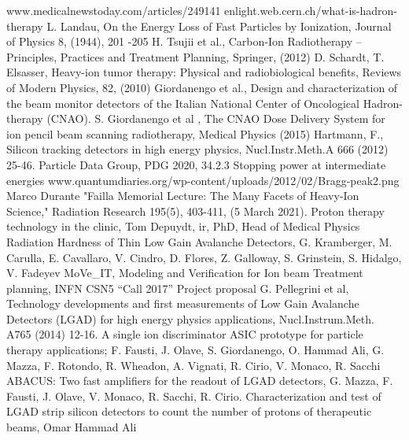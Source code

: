 \pagestyle{plain}
\begin{thebibliography}{00}	
	www.medicalnewstoday.com/articles/249141
	enlight.web.cern.ch/what-is-hadron-therapy
	L. Landau, On the Energy Loss of Fast Particles by Ionization, Journal of Physics 8, (1944), 201 -205
	H. Tsujii et al., Carbon-Ion Radiotherapy – Principles, Practices and Treatment Planning, Springer, (2012)
	D. Schardt, T. Elsasser, Heavy-ion tumor therapy: Physical and radiobiological benefits, Reviews of Modern Physics, 82, (2010)
	Giordanengo et al., Design and characterization of the beam monitor detectors of the Italian National Center of Oncological Hadron-therapy (CNAO).
	S. Giordanengo et al , The CNAO Dose Delivery System for ion pencil beam scanning radiotherapy, Medical Physics (2015)
	Hartmann, F., Silicon tracking detectors in high energy physics, Nucl.Instr.Meth.A 666 (2012) 25-46.
	Particle Data Group, PDG 2020, 34.2.3 Stopping power at intermediate energies
	www.quantumdiaries.org/wp-content/uploads/2012/02/Bragg-peak2.png
	Marco Durante "Failla Memorial Lecture: The Many Facets of Heavy-Ion Science," Radiation Research 195(5), 403-411, (5 March 2021).
	Proton therapy technology in the clinic, Tom Depuydt, ir, PhD, Head of Medical Physics
	Radiation Hardness of Thin Low Gain Avalanche Detectors, G. Kramberger, M. Carulla, E. Cavallaro, V. Cindro, D. Flores, Z. Galloway, S. Grinstein, S. Hidalgo, V. Fadeyev
	MoVe\_IT, Modeling and Verification for Ion beam Treatment planning, INFN CSN5 “Call 2017” Project proposal
	G. Pellegrini et al, Technology developments and first measurements of Low Gain Avalanche Detectors (LGAD) for high energy physics applications, Nucl.Instrum.Meth. A765 (2014) 12-16.
	A single ion discriminator ASIC prototype for particle therapy applications; F. Fausti, J. Olave, S. Giordanengo, O. Hammad Ali, G. Mazza, F. Rotondo, R. Wheadon, A. Vignati, R. Cirio, V. Monaco, R. Sacchi
	ABACUS: Two fast amplifiers for the readout of LGAD detectors, G. Mazza, F. Fausti, J. Olave, V. Monaco, R. Sacchi, R. Cirio.
	Characterization and test of LGAD strip silicon detectors to count the number of protons of therapeutic beams, Omar Hammad Ali

\end{thebibliography}
